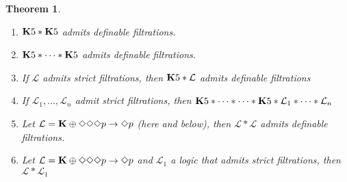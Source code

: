 \documentclass[a4paper]{article}
\theoremstyle{defin}
\theoremstyle{theorem}
\newtheorem{theorem}{Theorem}
\theoremstyle{prop}
\theoremstyle{lemma}
\theoremstyle{fact}
\theoremstyle{exercise}
\theoremstyle{ex}
\theoremstyle{col}
\theoremstyle{claim}
\begin{document}
\begin{theorem}
  $ $

  \begin{enumerate}
  \item ${\bf K}5 * {\bf K}5$ admits definable filtrations.
  \item ${\bf K}5 * \dots * {\bf K}5$ admits definable filtrations.
  \item If $\mathcal{L}$ admits strict filtrations, then ${\bf K}5 * \mathcal{L}$ admits definable filtrations
  \item If $\mathcal{L}_1, \dots, \mathcal{L}_n$ admit strict filtrations, then ${\bf K}5 * \dots * \dots * {\bf K}5 * \mathcal{L}_1 * \dots * \mathcal{L}_n$
  \item Let $\mathcal{L} = {\bf K} \oplus \Diamond \Diamond \Diamond p \to \Diamond p$  (here and below), then $\mathcal{L} * \mathcal{L}$ admits definable filtrations.
  \item Let $\mathcal{L} = {\bf K} \oplus \Diamond \Diamond \Diamond p \to \Diamond p$ and $\mathcal{L}_1$ a logic that admits strict filtrations, then $\mathcal{L} * \mathcal{L}_1$
  \end{enumerate}
\end{theorem}
\end{document}
